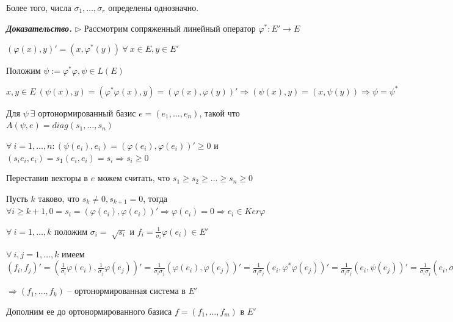 Более того, числа $\sigma_1, \dots, \sigma_r$ определены однозначно.

\vspace{\baselineskip}
\textbf{\textit{Доказательство.}} $\rhd$ Рассмотрим сопряженный линейный оператор $\varphi^*: E' \rightarrow E$

$(\varphi(x), y)' = (x, \varphi^*(y)) \ \forall \ x \in E, y \in E'$

\vspace{\baselineskip}
Положим $\psi:= \varphi^* \varphi, \psi \in L(E)$

$x, y \in E \ (\psi(x), y) = (\varphi^* \varphi(x), y) = (\varphi(x), \varphi(y))' \Rightarrow (\psi(x), y) = (x, \psi(y)) \Rightarrow \psi = \psi^*$

\vspace{\baselineskip}
Для $\psi \ \exists$ ортонормированный базис $e = (e_1, \dots, e_n)$, такой что $A(\psi, e) = diag(s_1, \dots, s_n)$

\vspace{\baselineskip}
$\forall \ i = 1, \dots, n: (\psi(e_i), e_i) = (\varphi(e_i), \varphi(e_i))' \geqslant 0$ и $(s_i e_i, e_i) = s_1 (e_i, e_i) = s_i \Rightarrow s_i \geqslant 0$

\vspace{\baselineskip}
Переставив векторы в $e$ можем считать, что $s_1 \geqslant s_2 \geqslant \dots \geqslant s_n \geqslant 0$

\vspace{\baselineskip}
Пусть $k$ таково, что $s_k \neq 0, s_{k+1} = 0$, тогда $\forall i \geqslant k + 1, 0 = s_i = (\varphi(e_i), \varphi(e_i))' \Rightarrow \varphi(e_i) = 0 \Rightarrow e_i \in Ker \varphi$

\vspace{\baselineskip}
$\forall \ i = 1, \dots, k$ положим $\sigma_i = \sqrt[]{s_i}$ и $f_i = \frac{1}{\sigma_i} \varphi(e_i) \in E'$

$\forall \ i, j = 1, \dots, k$ имеем $(f_i, f_j)' = (\frac{1}{\sigma_i} \varphi(e_i), \frac{1}{\sigma_j} \varphi(e_j))' = \frac{1}{\sigma_i \sigma_j}(\varphi(e_i), \varphi(e_j))' = \frac{1}{\sigma_i \sigma_j}(e_i, \varphi^* \varphi(e_j))' = \frac{1}{\sigma_i \sigma_j}(e_i, \psi(e_j))' = \frac{1}{\sigma_i \sigma_j}(e_i, \sigma_j^2 e_j)' = \frac{\sigma_j}{\sigma_i} (e_i, e_j) = \frac{\sigma_j}{\sigma_i} \delta_{ij} = \delta_{ij}$

$\Rightarrow (f_1, \dots, f_k)$ -- ортонормированная система в $E'$

\vspace{\baselineskip}
Дополним ее до ортонормированного базиса $f = (f_1, \dots, f_m)$ в $E'$

